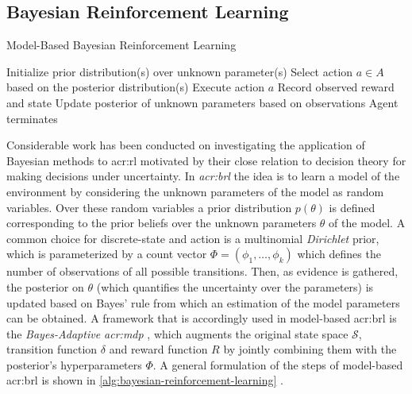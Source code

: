 \subsection{Bayesian Reinforcement Learning}
\label{sec:bayesian-reinforcement-learning}

\begin{algorithm}[t]
	\caption{Model-Based Bayesian Reinforcement Learning}
	\label{alg:bayesian-reinforcement-learning}
	\begin{algorithmic}[1]
		\State Initialize prior distribution(s) over unknown parameter(s)
		\Repeat
		\State Select action $a \in A$ based on the posterior distribution(s)
		\State Execute action $a$
		\State Record observed reward and state
		\State Update posterior of unknown parameters based on observations
		\Until Agent terminates
	\end{algorithmic}
\end{algorithm}

Considerable work has been conducted on investigating the application of Bayesian methods to \acrshort{acr:rl} motivated by their close relation to decision theory for making decisions under uncertainty. 
In \textit{\acrfull{acr:brl}} \cite{ghavamzadeh2015bayesian} the idea is to learn a model of the environment by considering the unknown parameters of the model as random variables.
Over these random variables a prior distribution $p(\theta)$ is defined corresponding to the prior beliefs over the unknown parameters $\theta$ of the model.
A common choice for discrete-state and action  is a multinomial \textit{Dirichlet} prior, which is parameterized by a count vector $\Phi = (\phi_1, \ldots, \phi_k)$ which defines the number of observations of all possible transitions.
Then, as evidence is gathered, the posterior on $\theta$ (which quantifies the uncertainty over the parameters) is updated based on Bayes' rule from which an estimation of the model parameters can be obtained.
A framework that is accordingly used in model-based \acrshort{acr:brl} is the \textit{Bayes-Adaptive \acrshort{acr:mdp}} \cite{guez2012efficient}, which augments the original state space $\mathcal{S}$, transition function $\delta$ and reward function $R$ by jointly combining them with the posterior's hyperparameters $\Phi$.
A general formulation of the steps of model-based \acrshort{acr:brl} is shown in \autoref{alg:bayesian-reinforcement-learning} \cite{png2011bayesian}.

